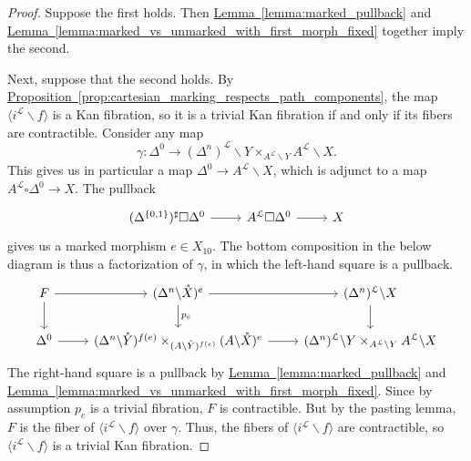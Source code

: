 \documentclass[main.tex]{subfiles}
\begin{document}
\begin{proof}
  Suppose the first holds. Then \hyperref[lemma:marked_pullback]{Lemma~\ref*{lemma:marked_pullback}} and \hyperref[lemma:marked_vs_unmarked_with_first_morph_fixed]{Lemma~\ref*{lemma:marked_vs_unmarked_with_first_morph_fixed}} together imply the second.

  Next, suppose that the second holds. By \hyperref[prop:cartesian_marking_respects_path_components]{Proposition~\ref*{prop:cartesian_marking_respects_path_components}}, the map $\langle i^{\mathcal{L}} \backslash f \rangle$ is a Kan fibration, so it is a trivial Kan fibration if and only if its fibers are contractible. Consider any map
  \begin{equation*}
    \gamma\colon \Delta^{0} \to (\Delta^{n})^{\mathcal{L}} \backslash Y \times_{A^{\mathcal{L}} \backslash Y} A^{\mathcal{L}} \backslash X.
  \end{equation*}
  This gives us in particular a map $\Delta^{0} \to A^{\mathcal{L}} \backslash X$, which is adjunct to a map $A^{\mathcal{L}} \square \Delta^{0} \to X$. The pullback
  \begin{equation*}
    \begin{tikzcd}
      (\Delta^{\{0, 1\}})^{\sharp} \square \Delta^{0}
      \arrow[r]
      & A^{\mathcal{L}} \square \Delta^{0}
      \arrow[r]
      & X
    \end{tikzcd}
  \end{equation*}
  gives us a marked morphism $e \in X_{10}$. The bottom composition in the below diagram is thus a factorization of $\gamma$, in which the left-hand square is a pullback.
  \begin{equation*}
    \begin{tikzcd}
      F
      \arrow[r]
      \arrow[d]
      & (\Delta^{n} \backslash \mathring{X})^{e}
      \arrow[r]
      \arrow[d, "p_{e}"]
      & (\Delta^{n})^{\mathcal{L}} \backslash X
      \arrow[d]
      \\
      \Delta^{0}
      \arrow[r]
      & (\Delta^{n} \backslash \mathring{Y})^{f(e)} \times_{(A \backslash \mathring{Y})^{f(e)}} (A \backslash \mathring{X})^{e}
      \arrow[r]
      & (\Delta^{n})^{\mathcal{L}} \backslash Y \times_{A^{\mathcal{L}} \backslash Y} A^{\mathcal{L}} \backslash X
    \end{tikzcd}
  \end{equation*}
  The right-hand square is a pullback by \hyperref[lemma:marked_pullback]{Lemma~\ref*{lemma:marked_pullback}} and \hyperref[lemma:marked_vs_unmarked_with_first_morph_fixed]{Lemma~\ref*{lemma:marked_vs_unmarked_with_first_morph_fixed}}. Since by assumption $p_{e}$ is a trivial fibration, $F$ is contractible. But by the pasting lemma, $F$ is the fiber of $\langle i^{\mathcal{L}} \backslash f \rangle$ over $\gamma$. Thus, the fibers of $\langle i^{\mathcal{L}} \backslash f \rangle$ are contractible, so $\langle i^{\mathcal{L}} \backslash f \rangle$ is a trivial Kan fibration.
\end{proof}
\end{document}
